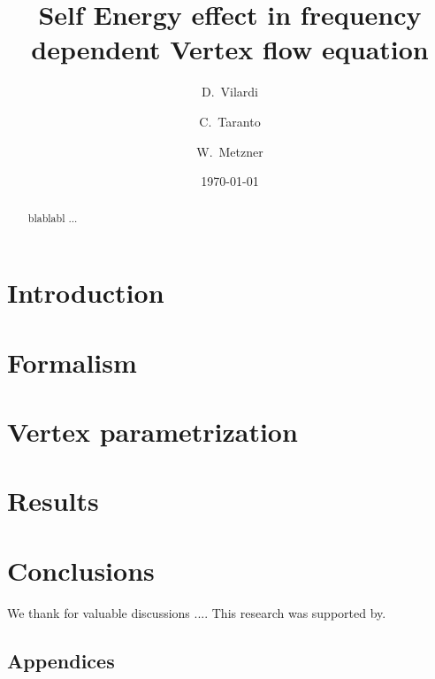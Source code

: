 \documentclass[aps,prb,twocolumn,showpacs,groupedaddress]{revtex4}
\begin{document}
\title{Self Energy effect in frequency dependent Vertex flow equation}

\author {D.~Vilardi}
\author{C.~Taranto}
\author{W.~Metzner}

\date{\today}

\begin{abstract}
blablabl ...
\end{abstract}

\pacs{}
\maketitle

\section{Introduction}
\label{sec:introduction}


\section{Formalism}
\label{sec:formalism}

\section{Vertex parametrization}
\label{sec:vertex}


\section{Results}
\label{sec:results}


\section{Conclusions}
\label{sec:conclusions}


\begin{acknowledgments}
We thank  for valuable discussions .... This research was supported by.
\end{acknowledgments}
\begin{widetext}
\section{Appendices}
\label{sec:appendices}

\end{widetext}



\end{document}
